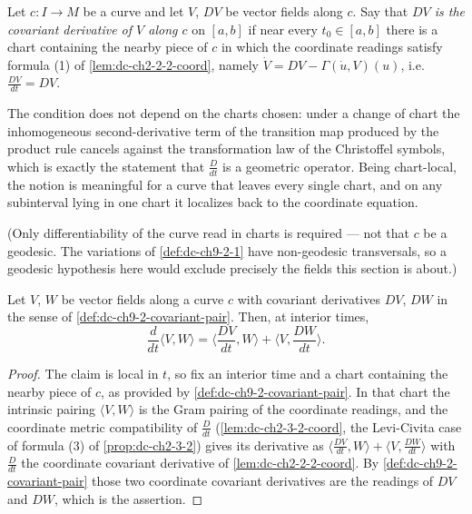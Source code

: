\begin{definition}
  \label{def:dc-ch9-2-covariant-pair}


  Let $c:I\to M$ be a curve and let $V$, $DV$ be vector fields along $c$. Say that
  \emph{$DV$ is the covariant derivative of $V$ along $c$} on $[a,b]$ if near every
  $t_0\in[a,b]$ there is a chart containing the nearby piece of $c$ in which the
  coordinate readings satisfy formula (1) of \cref{lem:dc-ch2-2-2-coord}, namely
  $\dot V=DV-\Gamma(\dot u,V)(u)$, i.e. $\frac{DV}{dt}=DV$.

  The condition does not depend on the charts chosen: under a change of chart the
  inhomogeneous second-derivative term of the transition map produced by the product rule
  cancels against the transformation law of the Christoffel symbols, which is exactly the
  statement that $\frac{D}{dt}$ is a geometric operator. Being chart-local, the notion is
  meaningful for a curve that leaves every single chart, and on any subinterval lying in
  one chart it localizes back to the coordinate equation.

  (Only differentiability of the curve read in charts is required --- not that $c$ be a
  geodesic. The variations of \cref{def:dc-ch9-2-1} have non-geodesic transversals, so a
  geodesic hypothesis here would exclude precisely the fields this section is about.)
\end{definition}
\begin{lemma}
  \label{lem:dc-ch9-2-covariant-pair-leibniz}


  Let $V$, $W$ be vector fields along a curve $c$ with covariant derivatives $DV$, $DW$
  in the sense of \cref{def:dc-ch9-2-covariant-pair}. Then, at interior times,
  $$
  \frac{d}{dt}\langle V,W\rangle=\Big\langle\frac{DV}{dt},W\Big\rangle
    +\Big\langle V,\frac{DW}{dt}\Big\rangle.
  $$
\end{lemma}
\begin{proof}

  \sketch
  The claim is local in $t$, so fix an interior time and a chart containing the nearby
  piece of $c$, as provided by \cref{def:dc-ch9-2-covariant-pair}. In that chart the
  intrinsic pairing $\langle V,W\rangle$ is the Gram pairing of the coordinate readings,
  and the coordinate metric compatibility of $\frac{D}{dt}$ (\cref{lem:dc-ch2-3-2-coord},
  the Levi-Civita case of formula (3) of \cref{prop:dc-ch2-3-2}) gives its derivative as
  $\langle\frac{DV}{dt},W\rangle+\langle V,\frac{DW}{dt}\rangle$ with $\frac{D}{dt}$ the
  coordinate covariant derivative of \cref{lem:dc-ch2-2-2-coord}. By
  \cref{def:dc-ch9-2-covariant-pair} those two coordinate covariant derivatives are the
  readings of $DV$ and $DW$, which is the assertion.
\end{proof}
